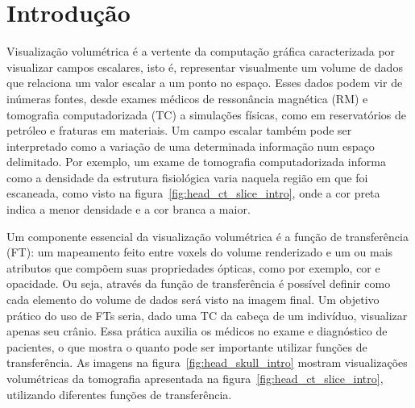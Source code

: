 
\chapter{Introdução}
\label{intro}
	Visualização volumétrica é a vertente da computação gráfica caracterizada por visualizar campos escalares, isto é, representar visualmente um volume de dados que relaciona um valor escalar a um ponto no espaço. Esses dados podem vir de inúmeras fontes, desde exames médicos de ressonância magnética (RM) e tomografia computadorizada (TC) a simulações físicas, como em reservatórios de petróleo e fraturas em materiais. Um campo escalar também pode ser interpretado como a variação de uma determinada informação num espaço delimitado. Por exemplo, um exame de tomografia computadorizada informa como a densidade da estrutura fisiológica varia naquela região em que foi escaneada, como visto na figura~\ref{fig:head_ct_slice_intro}, onde a cor preta indica a menor densidade e a cor branca a maior.
    
    Um componente essencial da visualização volumétrica é a função de transferência (FT): um mapeamento feito entre voxels do volume renderizado e um ou mais atributos que compõem suas propriedades ópticas, como por exemplo, cor e opacidade. Ou seja, através da função de transferência é possível definir como cada elemento do volume de dados será visto na imagem final. Um objetivo prático do uso de FTs seria, dado uma TC da cabeça de um indivíduo, visualizar apenas seu crânio. Essa prática auxilia os médicos no exame e diagnóstico de pacientes, o que mostra o quanto pode ser importante utilizar funções de transferência. As imagens na figura~\ref{fig:head_skull_intro} mostram visualizações volumétricas da tomografia apresentada na figura~\ref{fig:head_ct_slice_intro}, utilizando diferentes funções de transferência.

